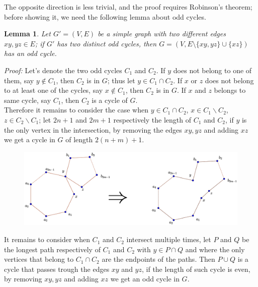 \documentclass[a4paper,12pt,oneside]{book}
\newtheorem{lemma}[theorem]{Lemma}
\begin{document}
The opposite direction is less trivial, and the proof requires  Robinson's theorem; before showing it, we need the following lemma about odd cycles.

\begin{lemma}\label{tech-lemma-graph}
Let $G'=(V,E)$ be a simple graph with two different edges $xy,yz\in E$; if $G'$ has two distinct odd cycles, then $G=(V,E\setminus\{xy,yz\}\cup\{xz\})$ has an odd cycle.
\end{lemma}
\textit{Proof:}
Let's denote the two odd cycles $C_1$ and $C_2$. If $y$ does not belong to one of them, say $y\notin C_1$, then $C_2$ is in $G$; thus let $y\in C_1\cap C_2$. 
If $x$ or $z$ does not belong to at least one of the cycles, say $x\notin C_1$, then $C_2$ is in $G$.
If $x$ and $z$ belongs to same cycle, say $C_1$, then $C_2$ is a cycle of $G$.  
\\ Therefore it remains to consider the case when $y\in C_1\cap C_2$, $x\in C_1 \backslash C_2$, 
$z\in C_2 \backslash C_1$; let $2n+1$ and $2m+1$ respectively the length of $C_1$ and $C_2$, if $y$ is the only vertex in the intersection,	 by removing the edges $xy,yz$ and adding $xz$ we get a cycle in $G$ of length $2(n+m)+1$. 
\begin{figure}[h]
\includegraphics[scale=0.25]{oddcycles1.eps}
\end{figure}

It remains to consider when $C_1$ and $C_2$ intersect multiple times, let $P$ and $Q$ be the longest path respectively of $C_1$ and $C_2$ with $y\in P\cap Q$ and where the only vertices that belong to $C_1\cap C_2$ are the endpoints of the paths.
Then $P\cup Q$ is a cycle that passes trough the edges $xy$ and $yz$, if the length of such cycle is even, by removing $xy,yz$ and adding $xz$ we get an odd cycle in $G$.
\end{document}
